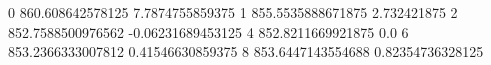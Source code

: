 0 860.608642578125 7.7874755859375
1 855.5535888671875 2.732421875
2 852.7588500976562 -0.06231689453125
4 852.8211669921875 0.0
6 853.2366333007812 0.41546630859375
8 853.6447143554688 0.82354736328125
